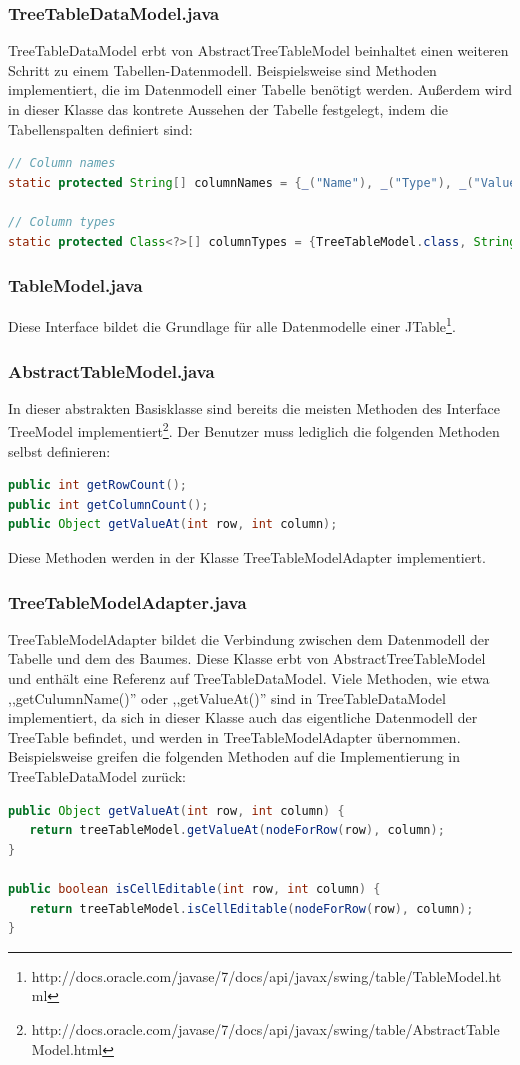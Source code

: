 \subsubsection*{TreeTableDataModel.java}
TreeTableDataModel erbt von AbstractTreeTableModel beinhaltet einen weiteren Schritt zu einem Tabellen-Datenmodell. Beispielsweise sind Methoden implementiert, die im Datenmodell einer Tabelle benötigt werden. Außerdem wird in dieser Klasse das kontrete Aussehen der Tabelle festgelegt, indem die Tabellenspalten definiert sind:
\begin{lstlisting}[language=JAVA]
// Column names
static protected String[] columnNames = {_("Name"), _("Type"), _("Value")};
 
// Column types
static protected Class<?>[] columnTypes = {TreeTableModel.class, String.class, Object.class};
\end{lstlisting}

\subsubsection*{TableModel.java}
Diese Interface bildet die Grundlage für alle Datenmodelle einer JTable\footnote{http://docs.oracle.com/javase/7/docs/api/javax/swing/table/TableModel.html}.

\subsubsection*{AbstractTableModel.java}
In dieser abstrakten Basisklasse sind bereits die meisten Methoden des Interface TreeModel implementiert\footnote{http://docs.oracle.com/javase/7/docs/api/javax/swing/table/AbstractTableModel.html}. Der Benutzer muss lediglich die folgenden Methoden selbst definieren:
\begin{lstlisting}[language=JAVA]
public int getRowCount();
public int getColumnCount();
public Object getValueAt(int row, int column);
\end{lstlisting}
Diese Methoden werden in der Klasse TreeTableModelAdapter implementiert.

\subsubsection*{TreeTableModelAdapter.java}
TreeTableModelAdapter bildet die Verbindung zwischen dem Datenmodell der Tabelle und dem des Baumes. Diese Klasse erbt von AbstractTreeTableModel und enthält eine Referenz auf TreeTableDataModel. Viele Methoden, wie etwa ,,getCulumnName()'' oder ,,getValueAt()'' sind in TreeTableDataModel implementiert, da sich in dieser Klasse auch das eigentliche Datenmodell der TreeTable befindet, und werden in TreeTableModelAdapter übernommen. Beispielsweise greifen die folgenden Methoden auf die Implementierung in TreeTableDataModel zurück:
\begin{lstlisting}[language=JAVA]
public Object getValueAt(int row, int column) {
   return treeTableModel.getValueAt(nodeForRow(row), column);
}

public boolean isCellEditable(int row, int column) {
   return treeTableModel.isCellEditable(nodeForRow(row), column);
}
\end{lstlisting}

